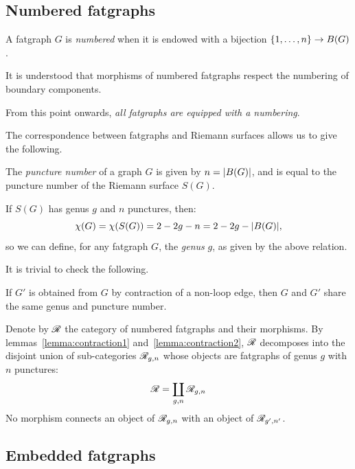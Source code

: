 \subsection{Numbered fatgraphs}
\label{sec:numbered-rg}

\begin{definition}
  A fatgraph $G$ is \emph{numbered} when it is endowed with a
  bijection $\{1,\ldots, n\} \to B(G)$.

  It is understood that morphisms of numbered fatgraphs respect the
  numbering of boundary components.
\end{definition}
From this point onwards, \emph{all fatgraphs are equipped with a
  numbering}.

The correspondence between fatgraphs and Riemann surfaces allows
us to give the following.
\begin{definition}\label{dfn:rg-genus}
  The \emph{puncture number} of a graph $G$ is given by $n =
  \lvert B(G)\rvert$, and is equal to the puncture number of the
  Riemann surface $S(G)$.

  If $S(G)$ has genus $g$ and $n$ punctures, then:
  \begin{equation}
    \label{eq:euler-characteristics-of-fatgraphs}
    \chi(G) = \chi(S(G)) = 2 - 2g - n = 2 - 2g - \lvert B(G)\rvert,
  \end{equation}
  so we can define, for any fatgraph $G$, the \emph{genus} $g$, as
  given by the above relation.
\end{definition}
It is trivial to check the following.
\begin{lemma}\label{lemma:contraction2}
  If $G'$ is obtained from $G$ by contraction of a non-loop edge,
  then $G$ and $G'$ share the same genus and puncture number.
\end{lemma}
Denote by $\mathscr{R}$ the category of numbered fatgraphs and their
morphisms.  By lemmas~\ref{lemma:contraction1}
and~\ref{lemma:contraction2}, $\mathscr{R}$ decomposes into the disjoint union
of sub-categories $\mathscr{R}_{g,n}$ whose objects are fatgraphs of genus
$g$ with $n$ punctures:
\begin{equation*}
  \mathscr{R} = \coprod_{g,n} \mathscr{R}_{g,n}
\end{equation*}
No morphism connects an object of $\mathscr{R}_{g,n}$ with an object of
$\mathscr{R}_{g',n'}$.


\subsection{Embedded fatgraphs}
\label{sec:embedded-rg}

